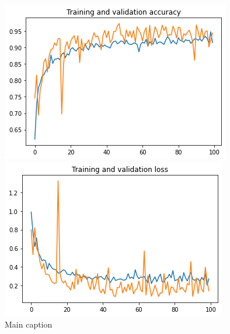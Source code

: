 \begin{figure}[ht]
  \centering
  \begin{minipage}[b]{0.4\linewidth}
    \centering
    \includegraphics[width=\linewidth]{Chapters/Chapter_5/figures/Training_and_validation_accuracy.png}
  \end{minipage}
  \hfill
  \begin{minipage}[b]{0.4\linewidth}
    \centering
    \includegraphics[width=\linewidth]{Chapters/Chapter_5/figures/Training_and_validation_loss.png}
  \end{minipage}
  \caption{Main caption}
  \label{fig:figure5_3}
  \end{figure}
  
  
